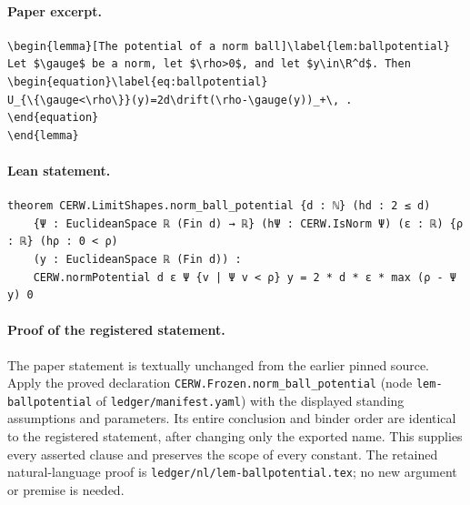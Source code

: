 \paragraph{Paper excerpt.}
\begin{verbatim}
\begin{lemma}[The potential of a norm ball]\label{lem:ballpotential}
Let $\gauge$ be a norm, let $\rho>0$, and let $y\in\R^d$. Then
\begin{equation}\label{eq:ballpotential}
U_{\{\gauge<\rho\}}(y)=2d\drift(\rho-\gauge(y))_+\, .
\end{equation}
\end{lemma}
\end{verbatim}
\paragraph{Lean statement.}
\begin{verbatim}
theorem CERW.LimitShapes.norm_ball_potential {d : ℕ} (hd : 2 ≤ d)
    {Ψ : EuclideanSpace ℝ (Fin d) → ℝ} (hΨ : CERW.IsNorm Ψ) (ε : ℝ) {ρ : ℝ} (hρ : 0 < ρ)
    (y : EuclideanSpace ℝ (Fin d)) :
    CERW.normPotential d ε Ψ {v | Ψ v < ρ} y = 2 * d * ε * max (ρ - Ψ y) 0
\end{verbatim}
\paragraph{Proof of the registered statement.}
The paper statement is textually unchanged from the earlier pinned source.
Apply the proved declaration \texttt{CERW.Frozen.norm\_ball\_potential}
(node \texttt{lem-ballpotential} of \texttt{ledger/manifest.yaml}) with the displayed
standing assumptions and parameters. Its entire conclusion and binder order
are identical to the registered statement, after changing only the exported
name. This supplies every asserted clause and preserves the scope of every
constant. The retained natural-language proof is
\texttt{ledger/nl/lem-ballpotential.tex}; no new argument or premise is needed.
